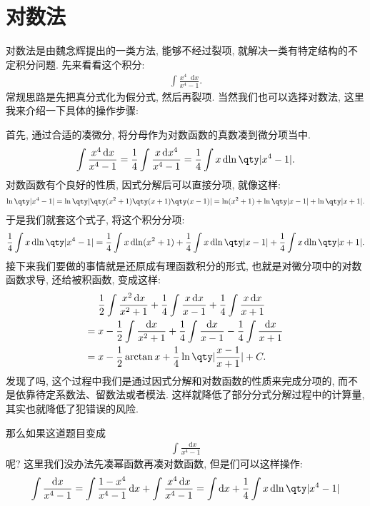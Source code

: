 \documentclass{ctexbook}
\newcommand*{\dif}{\mathop{}\!\mathrm{d}}
\begin{document}
{\section{对数法}
对数法是由魏念辉提出的一类方法, 能够不经过裂项, 就解决一类有特定结构的不定积分问题. 先来看看这个积分: 
\begin{align*}
\int\frac{x^{4}\dif{x}}{x^{4}-1}
.\end{align*}
常规思路是先把真分式化为假分式, 然后再裂项. 当然我们也可以选择对数法, 这里我来介绍一下具体的操作步骤: \par
首先, 通过合适的凑微分, 将分母作为对数函数的真数凑到微分项当中. 
\begin{align*}
\int\frac{x^{4}\dif{x}}{x^{4}-1}=\frac{1}{4}\int\frac{x\dif{x^{4}}}{x^{4}-1}=\frac{1}{4}\int x\dif{\ln\qty|x^{4}-1|}
.\end{align*}
对数函数有个良好的性质, 因式分解后可以直接分项, 就像这样: 
\begin{align*}
\ln\qty|x^{4}-1|=\ln\qty|\qty(x^{2}+1)\qty(x+1)\qty(x-1)|=\ln(x^{2}+1)+\ln\qty|x-1|+\ln\qty|x+1|
.\end{align*}
于是我们就套这个式子, 将这个积分分项: 
\begin{align*}
\frac{1}{4}\int x\dif{\ln\qty|x^{4}-1|}=\frac{1}{4}\int x\dif{\ln(x^{2}+1)}+\frac{1}{4}\int x\dif{\ln\qty|x-1|}+\frac{1}{4}\int x\dif{\ln\qty|x+1|}
.\end{align*}
接下来我们要做的事情就是还原成有理函数积分的形式, 也就是对微分项中的对数函数求导, 还给被积函数, 变成这样: 
\begin{align*}
{}&\frac{1}{2}\int\frac{x^{2}\dif{x}}{x^{2}+1}+\frac{1}{4}\int\frac{x\dif{x}}{x-1}+\frac{1}{4}\int\frac{x\dif{x}}{x+1}\\
={}&x-\frac{1}{2}\int\frac{\dif{x}}{x^{2}+1}+\frac{1}{4}\int\frac{\dif{x}}{x-1}-\frac{1}{4}\int\frac{\dif{x}}{x+1}\\
={}&x-\frac{1}{2}\arctan{x}+\frac{1}{4}\ln\qty|\frac{x-1}{x+1}|+C
.\end{align*}
发现了吗, 这个过程中我们是通过因式分解和对数函数的性质来完成分项的, 而不是依靠待定系数法、留数法或者模法. 这样就降低了部分分式分解过程中的计算量, 其实也就降低了犯错误的风险. \par
那么如果这道题目变成
\begin{align*}
\int\frac{\dif{x}}{x^{4}-1}
\end{align*}
呢? 这里我们没办法先凑幂函数再凑对数函数, 但是们可以这样操作: 
\begin{align*}
\int\frac{\dif{x}}{x^{4}-1}=\int\frac{1-x^{4}}{x^{4}-1}\dif{x}+\int\frac{x^{4}\dif{x}}{x^{4}-1}=\int\dif{x}+\frac{1}{4}\int x\dif{\ln\qty|x^{4}-1|}

\end{align*}}
\end{document}
